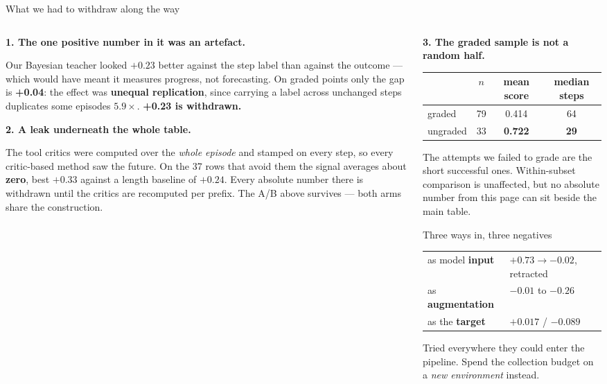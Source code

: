 \documentclass[11pt, aspectratio=169]{beamer}
\newcommand{\g}[1]{\textcolor{accent2}{\textbf{#1}}}
\newcommand{\bad}[1]{\textcolor{warn}{\textbf{#1}}}
\begin{document}
\begin{frame}{What we had to withdraw along the way}
\scriptsize
\begin{columns}[t]
\begin{column}{0.51\textwidth}
\textbf{1. The one positive number in it was an artefact.}

\smallskip
Our Bayesian teacher looked $+0.23$ better against the step label than against
the outcome --- which would have meant it measures progress, not forecasting.
On graded points only the gap is \g{+0.04}: the effect was \textbf{unequal
replication}, since carrying a label across unchanged steps duplicates some
episodes $5.9\times$. \bad{+0.23 is withdrawn.}

\medskip
\textbf{2. A leak underneath the whole table.}

\smallskip
The tool critics were computed over the \emph{whole episode} and stamped on
every step, so every critic-based method saw the future. On the 37 rows that
avoid them the signal averages about \textbf{zero}, best $+0.33$ against a
length baseline of $+0.24$. Every absolute number there is withdrawn until the
critics are recomputed per prefix. The A/B above survives --- both arms share
the construction.
\end{column}
\begin{column}{0.47\textwidth}
\textbf{3. The graded sample is not a random half.}

\smallskip
\begin{center}\scriptsize
\begin{tabular}{lccc}
\toprule
 & $n$ & mean score & median steps \\
\midrule
graded   & 79 & 0.414 & 64 \\
ungraded & 33 & \bad{0.722} & \bad{29} \\
\bottomrule
\end{tabular}
\end{center}
\smallskip
The attempts we failed to grade are the short successful ones. Within-subset
comparison is unaffected, but no absolute number from this page can sit beside
the main table.

\medskip
\begin{block}{Three ways in, three negatives}
\begin{tabular}{@{}ll@{}}
as model \textbf{input} & $+0.73 \rightarrow -0.02$, retracted \\
as \textbf{augmentation} & $-0.01$ to $-0.26$ \\
as the \textbf{target} & $+0.017$ / $-0.089$ \\
\end{tabular}

\smallskip
Tried everywhere they could enter the pipeline. Spend the collection budget on
a \emph{new environment} instead.
\end{block}
\end{column}
\end{columns}
\end{frame}
\end{document}

